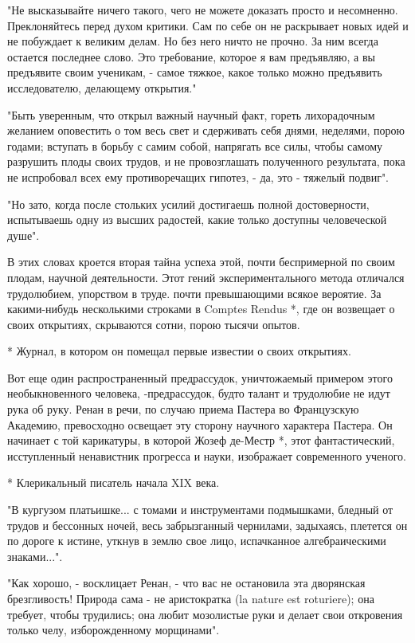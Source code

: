 "Не высказывайте ничего такого, чего не можете доказать просто и
несомненно. Преклоняйтесь перед духом критики. Сам по себе он не
раскрывает новых идей и не побуждает к великим делам. Но без него
ничто не прочно. За ним всегда остается последнее слово. Это
требование, которое я вам предъявляю, а вы предъявите своим ученикам,
- самое тяжкое, какое только можно предъявить исследователю, делающему
открытия."

"Быть уверенным, что открыл важный научный факт, гореть лихорадочным
желанием оповестить о том весь свет и сдерживать себя днями, неделями,
порою годами; вступать в борьбу с самим собой, напрягать все силы,
чтобы самому разрушить плоды своих трудов, и не провозглашать
полученного результата, пока не испробовал всех ему противоречащих
гипотез, - да, это - тяжелый подвиг".

"Но зато, когда после стольких усилий достигаешь полной достоверности,
испытываешь одну из высших радостей, какие только доступны
человеческой душе".

В этих словах кроется  вторая тайна успеха  этой, почти беспримерной  по
своим плодам, научной деятельности. Этот гений экспериментального метода
отличался трудолюбием,  упорством  в труде.  почти  превышающими  всякое
вероятие. За какими-нибудь несколькими строками в Comptes Rendus *,  где
он возвещает о своих открытиях, скрываются сотни, порою тысячи опытов.

* Журнал, в котором он помещал первые известии о своих открытиях.

Вот еще один распространенный предрассудок, уничтожаемый примером  этого
необыкновенного человека, -предрассудок,  будто талант  и трудолюбие  не
идут рука об руку. Ренан в речи, по случаю приема Пастера во Французскую
Академию, превосходно освещает эту  сторону научного характера  Пастера.
Он  начинает  с  той  карикатуры,  в  которой  Жозеф  де-Местр  *,  этот
фантастический, исступленный ненавистник  прогресса и науки,  изображает
современного ученого.

* Клерикальный писатель начала XIX века.

"В кургузом платьишке... с томами и инструментами подмышками, бледный от
трудов  и  бессонных  ночей,  весь  забрызганный  чернилами,  задыхаясь,
плетется он по дороге  к истине, уткнув в  землю свое лицо,  испачканное
алгебраическими знаками...".

"Как хорошо, - восклицает Ренан, - что вас не остановила эта  дворянская
брезгливость! Природа сама - не аристократка (la nature est  roturiere);
она требует, чтобы трудились;  она любит мозолистые  руки и делает  свои
откровения только челу, изборожденному морщинами".

